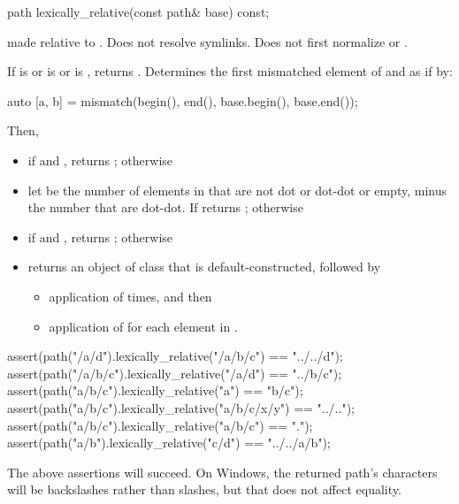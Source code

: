 %
\begin{itemdecl}
path lexically_relative(const path& base) const;
\end{itemdecl}

\begin{itemdescr}
\pnum
\returns {} made relative to .
Does not resolve symlinks.
Does not first normalize  or .

\pnum
\effects
If  is 
or  is 
or  is ,
returns .
Determines the first mismatched element of  and 
as if by:
\begin{codeblock}
auto [a, b] = mismatch(begin(), end(), base.begin(), base.end());
\end{codeblock}
Then,
\begin{itemize}
\item if  and , returns ; otherwise
\item
  let  be the number of  elements in 
  that are not dot or dot-dot or empty, minus the number that are dot-dot.
If  returns ; otherwise
\item
  if  and ,
  returns ; otherwise
\item returns an object of class  that is default-constructed, followed by
\begin{itemize}
\item application of 
   times, and then
\item application of 
  for each element in .
\end{itemize}
\end{itemize}

\pnum
\begin{example}
\begin{codeblock}
assert(path("/a/d").lexically_relative("/a/b/c") == "../../d");
assert(path("/a/b/c").lexically_relative("/a/d") == "../b/c");
assert(path("a/b/c").lexically_relative("a") == "b/c");
assert(path("a/b/c").lexically_relative("a/b/c/x/y") == "../..");
assert(path("a/b/c").lexically_relative("a/b/c") == ".");
assert(path("a/b").lexically_relative("c/d") == "../../a/b");
\end{codeblock}
The above assertions will succeed.
On Windows, the returned path's  characters
will be backslashes rather than slashes,
but that does not affect  equality.
\end{example}


\end{itemdescr}
